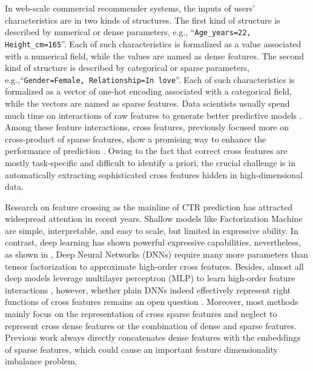 \documentclass[letterpaper]{article} \usepackage{aaai21}  \usepackage{times}  \usepackage{helvet} \usepackage{courier}  \usepackage[hyphens]{url}  \usepackage{graphicx} \urlstyle{rm} \def\UrlFont{\rm}  \usepackage{natbib}  \usepackage{caption} \frenchspacing  \setlength{\pdfpagewidth}{8.5in}  \setlength{\pdfpageheight}{11in}  \usepackage{graphicx}
\begin{document}
In web-scale commercial recommender systems, the inputs of users' characteristics are in two kinds of structures. The first kind of structure is described by numerical or dense parameters, e.g., ``\texttt{Age\_years=22, Height\_cm=165}''. Each of such characteristics is formalized as a value associated with a numerical field, while the values are named as dense features. The second kind of structure is described by categorical or sparse parameters, e.g.,``\texttt{Gender=Female, Relationship=In love}''. Each of such characteristics is formalized as a vector of one-hot encoding associated with a categorical field, while the vectors are named as sparse features. Data scientists usually spend much time on interactions of raw features to generate better predictive models \cite{lian2018xdeepfm,DBLP:conf/ijcai/OuyangZRQLD19}. 
Among these feature interactions, cross features, previously focused more on cross-product of sparse features,  show a promising way to enhance the performance of prediction .
Owing to the fact that correct cross features are mostly task-specific and difficult to identify a priori, the crucial challenge is in automatically extracting sophisticated cross features hidden in high-dimensional data. 

Research on feature crossing as the mainline of CTR prediction has attracted widespread attention in recent years. Shallow models like Factorization Machine \cite{DBLP:conf/icdm/Rendle10} are simple, interpretable, and easy to scale, but limited in expressive ability. In contrast, deep learning has shown powerful expressive capabilities, nevertheless, as shown in \cite{DBLP:conf/wsdm/BeutelCJXLGC18}, Deep Neural Networks (DNNs) require many more parameters than tensor factorization to approximate high-order cross features.
Besides, almost all deep models leverage multilayer perceptron (MLP) to learn high-order feature interactions , however, whether plain DNNs indeed effectively represent right functions of cross features remains an open question . 
Moreover, most methods mainly focus on the representation of cross sparse features and neglect to represent cross dense features or the combination of dense and sparse features. Previous work always directly concatenates dense features with the embeddings of sparse features, which could cause an important feature dimensionality imbalance problem.
\end{document}

